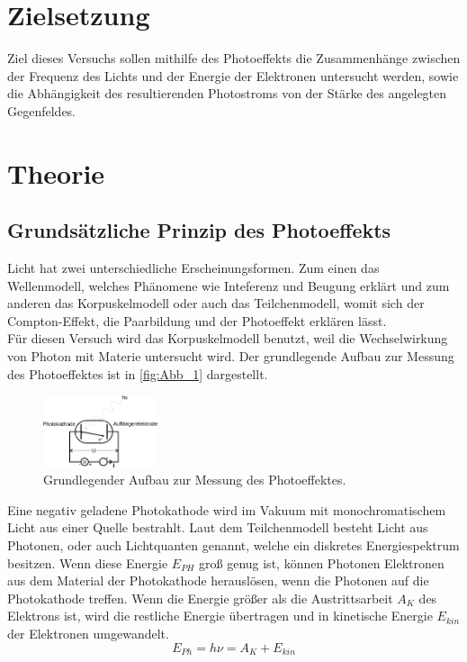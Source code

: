 \section{Zielsetzung}
\label{sec:Zielsetzung}
Ziel dieses Versuchs sollen mithilfe des Photoeffekts die Zusammenhänge zwischen der Frequenz
des Lichts und der Energie der Elektronen untersucht werden, sowie die Abhängigkeit des resultierenden
Photostroms von der Stärke des angelegten Gegenfeldes.
\section{Theorie}
\label{sec:Theorie}
\subsection{Grundsätzliche Prinzip des Photoeffekts}
\label{Grundsätzliche_theo}
Licht hat zwei unterschiedliche Erscheinungsformen. Zum einen das Wellenmodell,
welches Phänomene wie Inteferenz und Beugung erklärt und zum anderen das Korpuskelmodell oder
auch das Teilchenmodell, womit sich der Compton-Effekt, die Paarbildung und der Photoeffekt erklären lässt.\\
Für diesen Versuch wird das Korpuskelmodell benutzt, weil die Wechselwirkung von Photon mit Materie untersucht wird.
Der grundlegende Aufbau zur Messung des Photoeffektes ist in \autoref{fig:Abb_1} dargestellt.
\begin{figure}[H]
    \centering
    \includegraphics[width=0.3\textwidth]{build/Abb_1.pdf}
    \caption{Grundlegender Aufbau zur Messung des Photoeffektes.\cite{V500}}
    \label{fig:Abb_1}
\end{figure}
Eine negativ geladene Photokathode wird im Vakuum mit monochromatischem Licht aus einer Quelle bestrahlt.
Laut dem Teilchenmodell besteht Licht aus Photonen, oder auch Lichtquanten genannt, welche ein diskretes
Energiespektrum besitzen. Wenn diese Energie $E_{PH}$ groß genug ist, können Photonen  Elektronen aus dem 
Material der Photokathode herauslösen, wenn die Photonen auf die Photokathode treffen.
Wenn die Energie größer als die Austrittsarbeit $A_K$ des Elektrons ist, wird die restliche Energie übertragen 
und in kinetische Energie $E_{kin}$ der Elektronen umgewandelt.
\begin{equation}
    E_{Ph} = h\nu = A_K + E_{kin}
    \label{eqn:Energie}
\end{equation}
